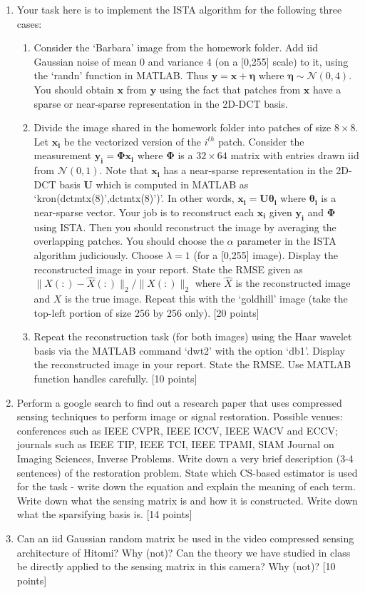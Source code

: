 \documentclass[11pt]{article}
\begin{document}
\begin{enumerate}
\item Your task here is to implement the ISTA algorithm for the following three cases:
\begin{enumerate}
\item Consider the `Barbara' image from the homework folder. Add iid Gaussian noise of mean 0 and variance 4 (on a [0,255] scale) to it, using the `randn' function in MATLAB. Thus $\boldsymbol{y} = \boldsymbol{x} + \boldsymbol{\eta}$ where $\boldsymbol{\eta} \sim \mathcal{N}(0,4)$. You should obtain $\boldsymbol{x}$ from $\boldsymbol{y}$ using the fact that patches from $\boldsymbol{x}$ have a sparse or near-sparse representation in the 2D-DCT basis. 
\item Divide the image shared in the homework folder into patches of size $8 \times 8$. Let $\boldsymbol{x_i}$ be the vectorized version of the $i^{th}$ patch. Consider the measurement $\boldsymbol{y_i} = \boldsymbol{\Phi x_i}$ where $\boldsymbol{\Phi}$ is a $32 \times 64$ matrix with entries drawn iid from $\mathcal{N}(0,1)$. Note that $\boldsymbol{x_i}$ has a near-sparse representation in the 2D-DCT basis $\boldsymbol{U}$ which is computed in MATLAB as `kron(dctmtx(8)',dctmtx(8)')'. In other words, $\boldsymbol{x_i} = \boldsymbol{U \theta_i}$ where $\boldsymbol{\theta_i}$ is a near-sparse vector. Your job is to reconstruct each $\boldsymbol{x_i}$ given $\boldsymbol{y_i}$ and $\boldsymbol{\Phi}$ using ISTA. Then you should reconstruct the image by averaging the overlapping patches. You should choose the $\alpha$ parameter in the ISTA algorithm judiciously. Choose $\lambda = 1$ (for a [0,255] image). Display the reconstructed image in your report. State the RMSE given as $\|X(:)-\hat{X}(:)\|_2/\|X(:)\|_2$ where $\hat{X}$ is the reconstructed image and $X$ is the true image. Repeat this with the `goldhill' image (take the top-left portion of size 256 by 256 only). \textsf{[20 points]}
\item Repeat the reconstruction task (for both images) using the Haar wavelet basis via the MATLAB command `dwt2' with the option `db1'. Display the reconstructed image in your report. State the RMSE. Use MATLAB function handles carefully. \textsf{[10 points]}
\end{enumerate}

\item Perform a google search to find out a research paper that uses compressed sensing techniques to perform image or signal restoration. Possible venues: conferences such as IEEE CVPR, IEEE ICCV, IEEE WACV and ECCV; journals such as IEEE TIP, IEEE TCI, IEEE TPAMI, SIAM Journal on Imaging Sciences, Inverse Problems. Write down a very brief description (3-4 sentences) of the restoration problem. State which CS-based estimator is used for the task - write down the equation and explain the meaning of each term. Write down what the sensing matrix is and how it is constructed. Write down what the sparsifying basis is. \textsf{[14 points]}

\item Can an iid Gaussian random matrix be used in the video compressed sensing architecture of Hitomi? Why (not)? Can the theory we have studied in class be directly applied to the sensing matrix in this camera? Why (not)? \textsf{[10 points]}

\end{enumerate}
\end{document}
